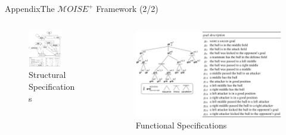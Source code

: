 \begin{frame}{Appendix}{The $\mathcal{M}OISE^+$ Framework (2/2)}

    \vspace{-2.5ex}

    \begin{columns}
        \hspace{-16ex}
        \begin{column}{0.5\textwidth}
            \centering
            \begin{figure}[H]
                \includegraphics[width=0.7\textwidth]{figures/soccer_ss.png}
                \caption*{Structural Specifications}
            \end{figure}
        \end{column}
        \hspace{-20ex}
        \begin{column}{0.5\textwidth}
            \centering
            \begin{figure}[H]
                \centering
                \includegraphics[width=1.2\textwidth]{figures/soccer_fs.png}
                \caption*{Functional Specifications}
            \end{figure}
        \end{column}
    \end{columns}


\end{frame}
